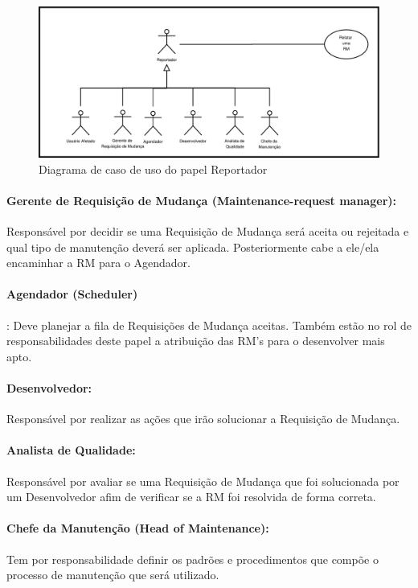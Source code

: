 \begin{figure}[htpb]
	\centering
	\includegraphics[width=0.8\linewidth]{./chapter-manutencao-software-visao-geral/img/diagrama-caso-uso-reportador.pdf}
	\caption{Diagrama de caso de uso do papel Reportador}
	\label{fig:diagrama-caso-uso-reportador}
\end{figure}

\paragraph{Gerente de Requisição de Mudança (Maintenance-request manager):}
Res\-pon\-sá\-vel por decidir se uma Requisição de Mudança será aceita ou
rejeitada e qual tipo de manutenção deverá ser aplicada. Posteriormente cabe a
ele/ela encaminhar a RM para o Agendador.

\paragraph{Agendador (Scheduler)}:
Deve planejar a fila de Requisições de Mudança aceitas. Também estão no rol de
responsabilidades deste papel a atribuição das RM's para o desenvolver mais
apto.

\paragraph{Desenvolvedor:}
Responsável por realizar as ações que irão solucionar a Requisição de Mudança.

\paragraph{Analista de Qualidade:}
Responsável por avaliar se uma Requisição de Mudança que foi solucionada por um
Desenvolvedor afim de verificar se a RM foi resolvida de forma correta.

\paragraph{Chefe da Manutenção (Head of	Maintenance):}
Tem por responsabilidade definir os padrões e procedimentos que compõe o
processo de manutenção que será utilizado.

